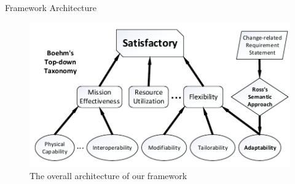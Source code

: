 \documentclass[xcolor=x11names,compress]{beamer}
\renewcommand{\(}{\begin{columns}}
\renewcommand{\)}{\end{columns}}
\newcommand{\<}[1]{\begin{column}{#1}}
\renewcommand{\>}{\end{column}}
\begin{document}
\begin{frame}{Framework Architecture}
\begin{figure}
\includegraphics[scale=0.6]{figures/architecture}
\caption{The overall architecture of our framework}
\end{figure}
\end{frame}

\end{document}
